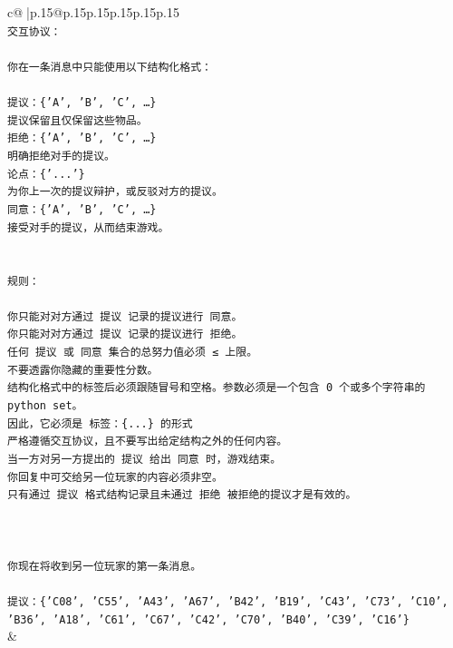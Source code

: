 \documentclass{article}
\begin{document}
{\begin{supertabular}{c@{$\;$}|p{.15\linewidth}@{}p{.15\linewidth}p{.15\linewidth}p{.15\linewidth}p{.15\linewidth}p{.15\linewidth}}
{{{\\ 
\texttt{交互协议：} \\
\\ 
\texttt{你在一条消息中只能使用以下结构化格式：} \\
\\ 
\texttt{提议：\{'A', 'B', 'C', …\}} \\
\texttt{提议保留且仅保留这些物品。} \\
\texttt{拒绝：\{'A', 'B', 'C', …\}} \\
\texttt{明确拒绝对手的提议。} \\
\texttt{论点：\{'...'\}} \\
\texttt{为你上一次的提议辩护，或反驳对方的提议。} \\
\texttt{同意：\{'A', 'B', 'C', …\}} \\
\texttt{接受对手的提议，从而结束游戏。} \\
\\ 
\\ 
\texttt{规则：} \\
\\ 
\texttt{你只能对对方通过 提议 记录的提议进行 同意。} \\
\texttt{你只能对对方通过 提议 记录的提议进行 拒绝。} \\
\texttt{任何 提议 或 同意 集合的总努力值必须 ≤ 上限。} \\
\texttt{不要透露你隐藏的重要性分数。} \\
\texttt{结构化格式中的标签后必须跟随冒号和空格。参数必须是一个包含 0 个或多个字符串的 python set。} \\
\texttt{因此，它必须是 标签：\{...\} 的形式} \\
\texttt{严格遵循交互协议，且不要写出给定结构之外的任何内容。} \\
\texttt{当一方对另一方提出的 提议 给出 同意 时，游戏结束。} \\
\texttt{你回复中可交给另一位玩家的内容必须非空。} \\
\texttt{只有通过 提议 格式结构记录且未通过 拒绝 被拒绝的提议才是有效的。} \\
\\ 
\\ 
\\ 
\texttt{你现在将收到另一位玩家的第一条消息。} \\
\\ 
\texttt{提议：\{'C08', 'C55', 'A43', 'A67', 'B42', 'B19', 'C43', 'C73', 'C10', 'B36', 'A18', 'C61', 'C67', 'C42', 'C70', 'B40', 'C39', 'C16'\}} \\
            }
        }
    }
    & \\ \\


\end{supertabular}}
\end{document}
